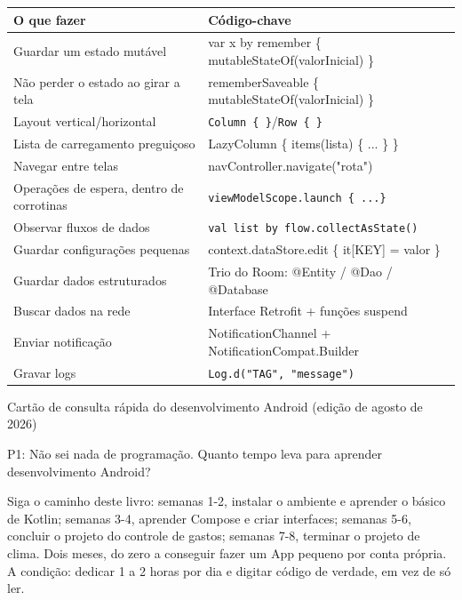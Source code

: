 


\begin{center}
\begin{tabularx}{\linewidth}{|X|X|}
\hline
\textbf{O que fazer} & \textbf{Código-chave} \tabularnewline
\hline
Guardar um estado mutável & var x by remember \{ mutableStateOf(valorInicial) \} \tabularnewline
Não perder o estado ao girar a tela & rememberSaveable \{ mutableStateOf(valorInicial) \} \tabularnewline
Layout vertical/horizontal & \texttt{Column \{ \}}/\texttt{Row \{ \}} \tabularnewline
Lista de carregamento preguiçoso & LazyColumn \{ items(lista) \{ ... \} \} \tabularnewline
Navegar entre telas & navController.navigate("rota") \tabularnewline
Operações de espera, dentro de corrotinas & \texttt{viewModelScope.\allowbreak launch \{ .\allowbreak .\allowbreak .\allowbreak  \}} \tabularnewline
Observar fluxos de dados & \texttt{val list by flow.\allowbreak collectAsState()} \tabularnewline
Guardar configurações pequenas & context.dataStore.edit \{ it[KEY] = valor \} \tabularnewline
Guardar dados estruturados & Trio do Room: @Entity / @Dao / @Database \tabularnewline
Buscar dados na rede & Interface Retrofit + funções suspend \tabularnewline
Enviar notificação & NotificationChannel + NotificationCompat.Builder \tabularnewline
Gravar logs & \texttt{Log.\allowbreak d("TAG", "message")} \tabularnewline
\hline
\end{tabularx}
\end{center}

\begin{center}\small\color{gray}Cartão de consulta rápida do desenvolvimento Android (edição de agosto de 2026)\end{center}


P1: Não sei nada de programação. Quanto tempo leva para aprender desenvolvimento Android?

Siga o caminho deste livro: semanas 1-2, instalar o ambiente e aprender o básico de Kotlin; semanas 3-4, aprender Compose e criar interfaces; semanas 5-6, concluir o projeto do controle de gastos; semanas 7-8, terminar o projeto de clima. Dois meses, do zero a conseguir fazer um App pequeno por conta própria. A condição: dedicar 1 a 2 horas por dia e digitar código de verdade, em vez de só ler.

